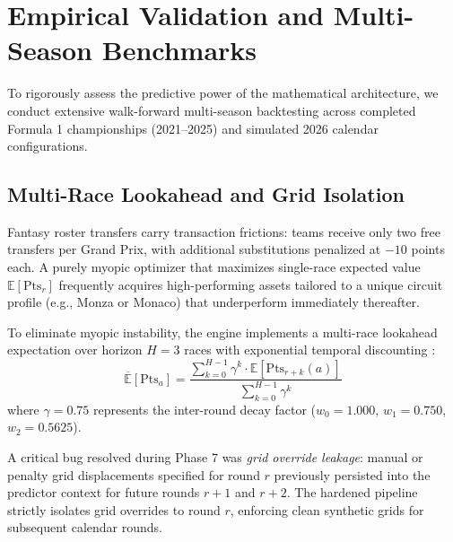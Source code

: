 \section{Empirical Validation and Multi-Season Benchmarks}
\label{sec:empirical_validation_results}

To rigorously assess the predictive power of the mathematical architecture, we conduct extensive walk-forward multi-season backtesting across completed Formula 1 championships (2021--2025) and simulated 2026 calendar configurations.

\subsection{Multi-Race Lookahead and Grid Isolation}
Fantasy roster transfers carry transaction frictions: teams receive only two free transfers per Grand Prix, with additional substitutions penalized at $-10$ points each. A purely myopic optimizer that maximizes single-race expected value $\mathbb{E}[\text{Pts}_r]$ frequently acquires high-performing assets tailored to a unique circuit profile (e.g., Monza or Monaco) that underperform immediately thereafter.

To eliminate myopic instability, the engine implements a multi-race lookahead expectation over horizon $H = 3$ races with exponential temporal discounting \cite{bekker2009stochastic}:
\begin{equation}
\overline{\mathbb{E}}[\text{Pts}_a] = \frac{\sum_{k=0}^{H-1} \gamma^k \cdot \mathbb{E}[\text{Pts}_{r+k}(a)]}{\sum_{k=0}^{H-1} \gamma^k}
\label{eq:lookahead_discounting}
\end{equation}
where $\gamma = 0.75$ represents the inter-round decay factor ($w_0 = 1.000$, $w_1 = 0.750$, $w_2 = 0.5625$).

A critical bug resolved during Phase 7 was \textit{grid override leakage}: manual or penalty grid displacements specified for round $r$ previously persisted into the predictor context for future rounds $r+1$ and $r+2$. The hardened pipeline strictly isolates grid overrides to round $r$, enforcing clean synthetic grids for subsequent calendar rounds.

